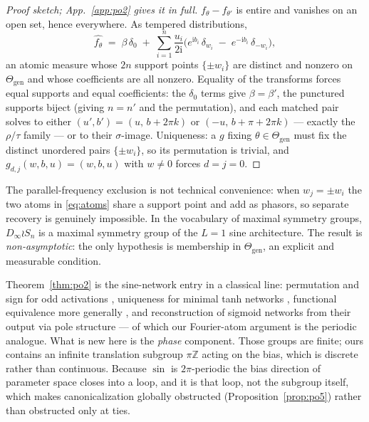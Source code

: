 \documentclass[10pt,twocolumn,letterpaper]{article}
\theoremstyle{definition}
\newcommand{\Z}{\mathbb{Z}}
\newcommand{\Dinf}{D_\infty}
\newcommand{\Thgen}{\Theta_{\mathrm{gen}}}
\begin{document}
\begin{proof}[Proof sketch; App.~\ref{app:po2} gives it in full]
$f_\theta - f_{\theta'}$ is entire and vanishes on an open set, hence everywhere. As tempered
distributions,
\begin{equation}
\widehat{f_\theta} \;=\; \beta\,\delta_0 \;+\; \sum_{i=1}^{n} \frac{u_i}{2\mathrm i}
\Big( e^{\mathrm i b_i}\,\delta_{w_i} \;-\; e^{-\mathrm i b_i}\,\delta_{-w_i} \Big),
\label{eq:atoms}
\end{equation}
an atomic measure whose $2n$ support points $\{\pm w_i\}$ are distinct and nonzero on $\Thgen$
and whose coefficients are all nonzero. Equality of the transforms forces equal supports and
equal coefficients: the $\delta_0$ terms give $\beta=\beta'$, the punctured supports biject
(giving $n=n'$ and the permutation), and each matched pair solves to either
$(u',b') = (u,\, b+2\pi k)$ or $(-u,\, b+\pi+2\pi k)$ --- exactly the $\rho/\tau$ family --- or
to their $\sigma$-image. Uniqueness: a $g$ fixing $\theta \in \Thgen$ must fix the distinct
unordered pairs $\{\pm w_i\}$, so its permutation is trivial, and $g_{d,j}(w,b,u)=(w,b,u)$ with
$w\neq0$ forces $d=j=0$.
\end{proof}

The parallel-frequency exclusion is not technical convenience: when $w_j = \pm w_i$ the two atoms
in \eqref{eq:atoms} share a support point and add as phasors, so separate recovery is genuinely
impossible. In the vocabulary of maximal symmetry groups, $\Dinf\wr S_n$ is a maximal symmetry
group of the $L=1$ sine architecture. The result is \emph{non-asymptotic}: the only hypothesis is
membership in $\Thgen$, an explicit and measurable condition.

Theorem~\ref{thm:po2} is the sine-network entry in a classical line: permutation and sign
for odd activations \citep{hechtnielsen1990algebraic}, uniqueness for minimal tanh networks
\citep{sussmann1992uniqueness}, functional equivalence more generally
\citep{kurkova1994functionally}, and reconstruction of sigmoid networks from their output via pole
structure \citep{fefferman1994reconstructing} --- of which our Fourier-atom argument is the
periodic analogue. What is new here is the \emph{phase} component. Those groups are finite; ours contains an
infinite translation subgroup $\pi\Z$ acting on the bias, which is discrete rather than
continuous. Because $\sin$ is $2\pi$-periodic the bias direction of parameter space closes into a
loop, and it is that loop, not the subgroup itself, which makes canonicalization globally
obstructed (Proposition~\ref{prop:po5}) rather than obstructed only at ties.
\end{document}
